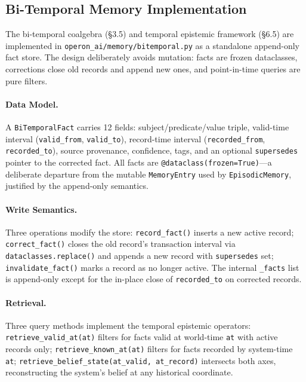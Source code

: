 \subsection{Bi-Temporal Memory Implementation}
\label{sec:bitemporal-impl}

The bi-temporal coalgebra (\S3.5) and temporal epistemic framework (\S6.5) are implemented in \texttt{operon\_ai/memory/bitemporal.py} as a standalone append-only fact store. The design deliberately avoids mutation: facts are frozen dataclasses, corrections close old records and append new ones, and point-in-time queries are pure filters.

\paragraph{Data Model.}
A \texttt{BiTemporalFact} carries 12 fields: subject/predicate/value triple, valid-time interval (\texttt{valid\_from}, \texttt{valid\_to}), record-time interval (\texttt{recorded\_from}, \texttt{recorded\_to}), source provenance, confidence, tags, and an optional \texttt{supersedes} pointer to the corrected fact. All facts are \texttt{@dataclass(frozen=True)}---a deliberate departure from the mutable \texttt{MemoryEntry} used by \texttt{EpisodicMemory}, justified by the append-only semantics.

\paragraph{Write Semantics.}
Three operations modify the store: \texttt{record\_fact()} inserts a new active record; \texttt{correct\_fact()} closes the old record's transaction interval via \texttt{dataclasses.replace()} and appends a new record with \texttt{supersedes} set; \texttt{invalidate\_fact()} marks a record as no longer active. The internal \texttt{\_facts} list is append-only except for the in-place close of \texttt{recorded\_to} on corrected records.

\paragraph{Retrieval.}
Three query methods implement the temporal epistemic operators: \texttt{retrieve\_valid\_at(at)} filters for facts valid at world-time \texttt{at} with active records only; \texttt{retrieve\_known\_at(at)} filters for facts recorded by system-time \texttt{at}; \texttt{retrieve\_belief\_state(at\_valid, at\_record)} intersects both axes, reconstructing the system's belief at any historical coordinate.

